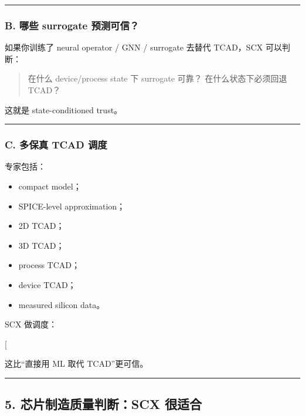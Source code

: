 \documentclass[
  12pt,
]{ctexart}
\providecommand{\tightlist}{%
  \setlength{\itemsep}{0pt}\setlength{\parskip}{0pt}}
\begin{document}
\begin{center}\rule{0.5\linewidth}{0.5pt}\end{center}

\subsubsection{B. 哪些 surrogate
预测可信？}\label{b.-ux54eaux4e9b-surrogate-ux9884ux6d4bux53efux4fe1}

如果你训练了 neural operator / GNN / surrogate 去替代 TCAD，SCX
可以判断：

\begin{quote}
在什么 device/process state 下 surrogate 可靠？ 在什么状态下必须回退
TCAD？
\end{quote}

这就是 state-conditioned trust。

\begin{center}\rule{0.5\linewidth}{0.5pt}\end{center}

\subsubsection{C. 多保真 TCAD
调度}\label{c.-ux591aux4fddux771f-tcad-ux8c03ux5ea6}

专家包括：

\begin{itemize}
\tightlist
\item
  compact model；
\item
  SPICE-level approximation；
\item
  2D TCAD；
\item
  3D TCAD；
\item
  process TCAD；
\item
  device TCAD；
\item
  measured silicon data。
\end{itemize}

SCX 做调度：

{[}  \rightarrow {} \rightarrow
{} \rightarrow \text{silicon validation}{]}

这比``直接用 ML 取代 TCAD''更可信。

\begin{center}\rule{0.5\linewidth}{0.5pt}\end{center}

\subsection{5. 芯片制造质量判断：SCX
很适合}\label{ux82afux7247ux5236ux9020ux8d28ux91cfux5224ux65adscx-ux5f88ux9002ux5408}
\end{document}
